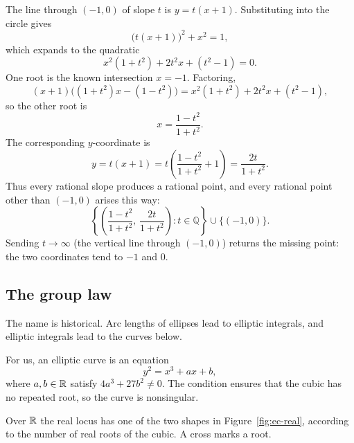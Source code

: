 
The line through $(-1,0)$ of slope $t$ is $y=t(x+1)$. Substituting into the circle gives
\[
    \bigl(t(x+1)\bigr)^2+x^2=1,
\]
which expands to the quadratic
\[
    x^2(1+t^2)+2t^2 x+(t^2-1)=0.
\]
One root is the known intersection $x=-1$. Factoring,
\[
    (x+1)\bigl((1+t^2)x-(1-t^2)\bigr)
    =x^2(1+t^2)+2t^2 x+(t^2-1),
\]
so the other root is
\[
    x=\frac{1-t^2}{1+t^2}.
\]
The corresponding $y$-coordinate is
\[
    y=t(x+1)=t\left(\frac{1-t^2}{1+t^2}+1\right)
    =\frac{2t}{1+t^2}.
\]
Thus every rational slope produces a rational point, and every rational point other than $(-1,0)$ arises this way:
\[
    \left\{
        \left(\frac{1-t^2}{1+t^2},\,\frac{2t}{1+t^2}\right)
        : t\in\mathbb{Q}
    \right\}
    \cup\{(-1,0)\}.
\]
Sending $t\to\infty$ (the vertical line through $(-1,0)$) returns the missing point: the two coordinates tend to $-1$ and $0$.

\subsection{The group law}

The name is historical. Arc lengths of ellipses lead to elliptic integrals, and elliptic integrals lead to the curves below.

\begin{keybox}
\begin{definition}
For us, an elliptic curve is an equation
\[
    y^2=x^3+ax+b,
\]
where $a,b\in\mathbb R$ satisfy $4a^3+27b^2\neq 0$. The condition ensures that the cubic has no repeated root, so the curve is nonsingular.
\end{definition}
\end{keybox}


Over $\mathbb R$ the real locus has one of the two shapes in Figure~\ref{fig:ec-real}, according to the number of real roots of the cubic. A cross marks a root.

